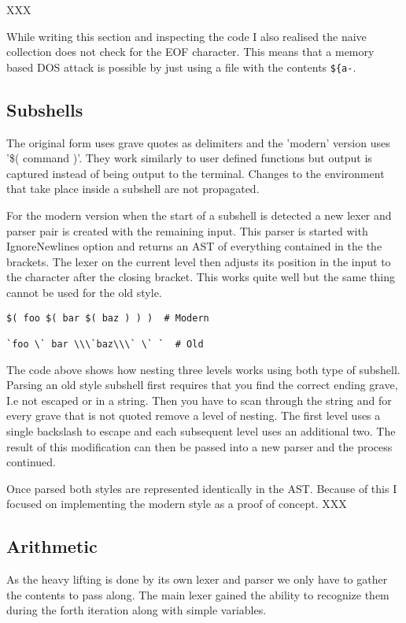 XXX

While writing this section and inspecting the code I also realised the naive collection does not check for the EOF character.
This means that a memory based DOS attack is possible by just using a file with the contents \verb!${a-!.

\subsection{Subshells}
The original form uses grave quotes as delimiters and the 'modern' version uses '\$( command )'.
They work similarly to user defined functions but output is captured instead of being output to the terminal.
Changes to the environment that take place inside a subshell are not propagated. 

For the modern version when the start of a subshell is detected a new lexer and parser pair is created with the remaining input.
This parser is started with IgnoreNewlines option and returns an AST of everything contained in the the brackets.
The lexer on the current level then adjusts its position in the input to the character after the closing bracket.
This works quite well but the same thing cannot be used for the old style.

\begin{verbatim}
$( foo $( bar $( baz ) ) )  # Modern

`foo \` bar \\\`baz\\\` \` `  # Old
\end{verbatim}
The code above shows how nesting three levels works using both type of subshell.
Parsing an old style subshell first requires that you find the correct ending grave, I.e not escaped or in a string.
Then you have to scan through the string and for every grave that is not quoted remove a level of nesting.
The first level uses a single backslash to escape and each subsequent level uses an additional two.
The result of this modification can then be passed into a new parser and the process continued.

Once parsed both styles are represented identically in the AST.
Because of this I focused on implementing the modern style as a proof of concept.
XXX

\subsection{Arithmetic} \label{sec:main-lexer-arith}
As the heavy lifting is done by its own lexer and parser we only have to gather the contents to pass along.
The main lexer gained the ability to recognize them during the forth iteration along with simple variables.

